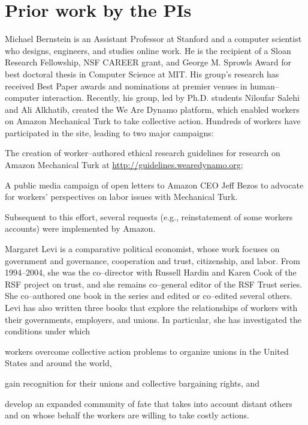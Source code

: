 \documentclass[11pt]{article}
\begin{document}
\section{Prior work by the PIs}

Michael Bernstein is an Assistant Professor at Stanford and a computer scientist who
  designs,
  engineers, and
  studies
online work.
He is the recipient of
  a Sloan Research Fellowship,
  NSF CAREER grant, and
  George M. Sprowls Award for best doctoral thesis in Computer Science at MIT.
His group's research has received Best Paper awards and nominations at premier venues in
human--computer interaction.
Recently, his group, led by Ph.D. students
  Niloufar Salehi and
  Ali Alkhatib,
created the We Are Dynamo platform,
which enabled workers on Amazon Mechanical Turk to take collective action.
Hundreds of workers have participated in the site,
leading to two major campaigns:
\begin{inlinelist}
  \item The creation of worker--authored ethical research guidelines
  for research on Amazon Mechanical Turk at \url{http://guidelines.wearedynamo.org};
  \item A public media campaign of open letters to
  Amazon CEO Jeff Bezos
  to advocate for workers' perspectives on labor issues with Mechanical Turk.
\end{inlinelist}
Subsequent to this effort, several requests
(e.g., reinstatement of some workers accounts)
were implemented by Amazon.

Margaret Levi is a comparative political economist,
whose work focuses on
  government and governance,
  cooperation and trust,
  citizenship, and
  labor.
From 1994--2004,
she was the co--director with
  Russell Hardin and
  Karen Cook
of the RSF project on trust,
and she remains co--general editor of the RSF Trust series.
She co--authored one book in the series and edited or co--edited several others.
Levi has also written three books that explore the relationships of
  workers with their
    governments,
    employers, and
    unions.
In particular,
she has investigated the conditions under which
\begin{inlinelist}
  \item workers overcome collective action problems to organize unions
    in the United States and
    around the world,
  \item gain recognition for their unions and
    collective bargaining rights, and
  \item develop an expanded community of fate
  that takes into account distant others and
  on whose behalf the workers are willing to take costly actions.
\end{inlinelist}
\end{document}

